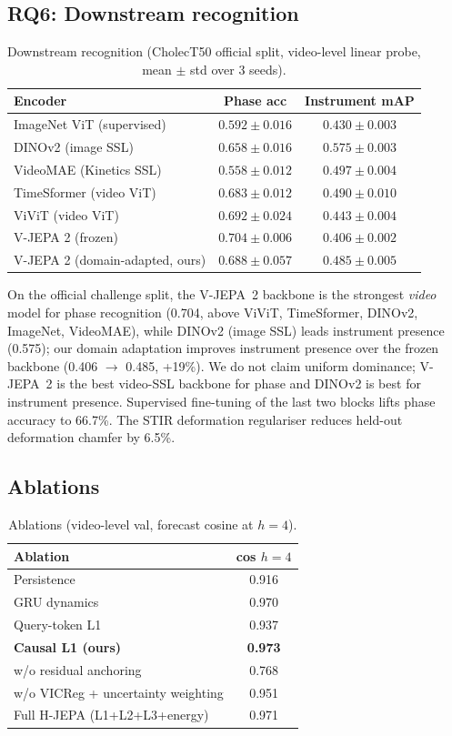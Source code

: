 \documentclass[final,3p,times,twocolumn]{elsarticle}
\begin{document}
\subsection{RQ6: Downstream recognition}
\begin{table}[t]
\centering
\caption{Downstream recognition (CholecT50 official split, video-level linear probe, mean $\pm$ std over 3 seeds).}
\label{tab:downstream}
\small
\begin{tabular}{lcc}
\toprule
Encoder & Phase acc & Instrument mAP \\
\midrule
ImageNet ViT (supervised) & $0.592 \pm 0.016$ & $0.430 \pm 0.003$ \\
DINOv2 (image SSL) & $0.658 \pm 0.016$ & $\mathbf{0.575 \pm 0.003}$ \\
VideoMAE (Kinetics SSL) & $0.558 \pm 0.012$ & $0.497 \pm 0.004$ \\
TimeSformer (video ViT) & $0.683 \pm 0.012$ & $0.490 \pm 0.010$ \\
ViViT (video ViT) & $0.692 \pm 0.024$ & $0.443 \pm 0.004$ \\
V-JEPA 2 (frozen) & $\mathbf{0.704 \pm 0.006}$ & $0.406 \pm 0.002$ \\
V-JEPA 2 (domain-adapted, ours) & $0.688 \pm 0.057$ & $0.485 \pm 0.005$ \\
\bottomrule
\end{tabular}
\end{table}

On the official challenge split, the V-JEPA~2 backbone is the strongest \emph{video} model for phase recognition (0.704, above ViViT, TimeSformer, DINOv2, ImageNet, VideoMAE), while DINOv2 (image SSL) leads instrument presence (0.575); our domain adaptation improves instrument presence over the frozen backbone (0.406 $\to$ 0.485, +19\%). We do not claim uniform dominance; V-JEPA~2 is the best video-SSL backbone for phase and DINOv2 is best for instrument presence. Supervised fine-tuning of the last two blocks lifts phase accuracy to 66.7\%. The STIR deformation regulariser reduces held-out deformation chamfer by 6.5\%.

\subsection{Ablations}
\begin{table}[t]
\centering
\caption{Ablations (video-level val, forecast cosine at $h{=}4$).}
\label{tab:ablation}
\small
\begin{tabular}{lc}
\toprule
Ablation & cos $h{=}4$ \\
\midrule
Persistence & 0.916 \\
GRU dynamics & 0.970 \\
Query-token L1 & 0.937 \\
\textbf{Causal L1 (ours)} & \textbf{0.973} \\
\quad w/o residual anchoring & 0.768 \\
\quad w/o VICReg + uncertainty weighting & 0.951 \\
Full H-JEPA (L1+L2+L3+energy) & 0.971 \\
\bottomrule
\end{tabular}
\end{table}
\end{document}

